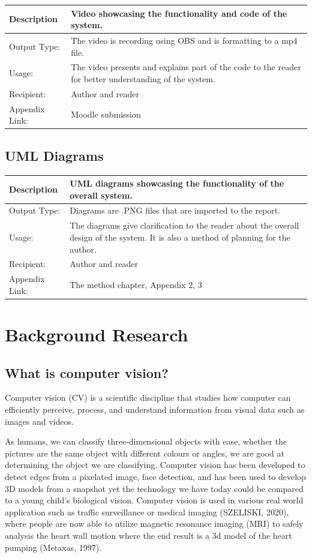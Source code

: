 \documentclass[12pt]{report}
\begin{document}
\begin{tabular}{|p{2.2cm}|p{11cm}|}
	\hline
	Description & Video showcasing the functionality and code of the system.\\
	\hline
	Output Type: & The video is recording using OBS and is formatting to a mp4 file.  \\
	\hline
	Usage: & The video presents and explains part of the code to the reader for better understanding of the system. \\
	\hline
	Recipient: & Author and reader \\
	\hline
	Appendix Link: & Moodle submission \\
	\hline
\end{tabular}

\section{UML Diagrams}

\begin{tabular}{|p{2.2cm}|p{11cm}|}
	\hline
	Description & UML diagrams showcasing the functionality of the overall system.\\
	\hline
	Output Type: & Diagrams are .PNG files that are imported to the report.  \\
	\hline
	Usage: & The diagrams give clarification to the reader about the overall design of the system. It is also a method of planning for the author. \\
	\hline
	Recipient: & Author and reader \\
	\hline
	Appendix Link: & The method chapter, Appendix 2, 3 \\
	\hline
\end{tabular}

\chapter{Background Research}

\section{What is computer vision?}

Computer vision (CV) is a scientific discipline that studies how computer can efficiently perceive, process, and understand information from visual data such as images and videos.

\vspace{2mm}

As humans, we can classify three-dimensional objects with ease, whether the pictures are the same object with different colours or angles, we are good at determining the object we are classifying. 
Computer vision has been developed to detect edges from a pixelated image, face detection, and has been used to develop 3D models from a snapshot yet the technology we have today could be compared to a young child's biological vision. 
Computer vision is used in various real world application such as traffic surveillance or medical imaging (SZELISKI, 2020), where people are now able to utilize magnetic resonance imaging (MRI) to safely analysis the heart wall motion where the end result is a 3d model of the heart pumping (Metaxas, 1997). 
\end{document}
